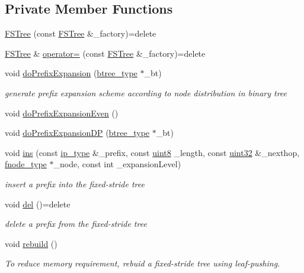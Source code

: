 \subsection*{Private Member Functions}
\begin{DoxyCompactItemize}
\item 
\hyperlink{classFSTree_ab08e8d95d102eb5afce8a8eac49170c9}{F\-S\-Tree} (const \hyperlink{classFSTree}{F\-S\-Tree} \&\-\_\-factory)=delete
\item 
\hyperlink{classFSTree}{F\-S\-Tree} \& \hyperlink{classFSTree_ac3854f7bc1f756436424ee56b072865e}{operator=} (const \hyperlink{classFSTree}{F\-S\-Tree} \&\-\_\-factory)=delete
\item 
void \hyperlink{classFSTree_a3a8ba10010bb3cb2079f7cda85f542ae}{do\-Prefix\-Expansion} (\hyperlink{classFSTree_a33535253397298880117e194d531f9f6}{btree\-\_\-type} $\ast$\-\_\-bt)
\begin{DoxyCompactList}\small\item\em generate prefix expansion scheme according to node distribution in binary tree \end{DoxyCompactList}\item 
void \hyperlink{classFSTree_af5ea26c5d00f921a78afe0ea8e5d58fd}{do\-Prefix\-Expansion\-Even} ()
\item 
void \hyperlink{classFSTree_a4ec4932ece82352807cf55be6d6cd233}{do\-Prefix\-Expansion\-D\-P} (\hyperlink{classFSTree_a33535253397298880117e194d531f9f6}{btree\-\_\-type} $\ast$\-\_\-bt)
\item 
void \hyperlink{classFSTree_a4edff02f4e6f20830c67d9eceb08b242}{ins} (const \hyperlink{classFSTree_a4766ee89821315425e2c6090bd0a0245}{ip\-\_\-type} \&\-\_\-prefix, const \hyperlink{types_8h_a34ecedcf03a70dc91e4616212d79267d}{uint8} \-\_\-length, const \hyperlink{types_8h_abd01e8e67e3d94cab04ecaaf4f85ac1b}{uint32} \&\-\_\-nexthop, \hyperlink{classFSTree_a67d384ab5a196299d83dde842299fe7f}{fnode\-\_\-type} $\ast$\-\_\-node, const int \-\_\-expansion\-Level)
\begin{DoxyCompactList}\small\item\em insert a prefix into the fixed-\/stride tree \end{DoxyCompactList}\item 
void \hyperlink{classFSTree_a345979590c879b10eaf76e8c42c9d8cf}{del} ()=delete
\begin{DoxyCompactList}\small\item\em delete a prefix from the fixed-\/stride tree \end{DoxyCompactList}\item 
void \hyperlink{classFSTree_a795e0b2a65902afc562e15555613c7e5}{rebuild} ()
\begin{DoxyCompactList}\small\item\em To reduce memory requirement, rebuid a fixed-\/stride tree using leaf-\/pushing. \end{DoxyCompactList}\end{DoxyCompactItemize}
